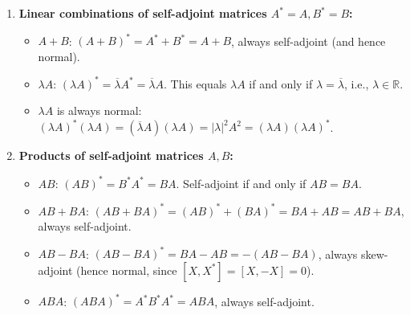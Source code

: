 \begin{exercisesolution*}
\label{sol:algebra_self_adjoint_normal_mc}
\begin{enumerate}[label=\textbf{(\alph*)}]
    \item \textbf{Linear combinations of self-adjoint matrices $A^* = A, B^* = B$:}
    \begin{itemize}
        \item $A + B$: $(A+B)^* = A^* + B^* = A + B$, always self-adjoint (and hence normal).
        \item $\lambda A$: $(\lambda A)^* = \overline{\lambda} A^* = \overline{\lambda} A$. This equals $\lambda A$ if and only if $\lambda = \overline{\lambda}$, i.e., $\lambda \in \mathbb{R}$.
        \item $\lambda A$ is always normal: $(\lambda A)^* (\lambda A) = (\overline{\lambda} A)(\lambda A) = |\lambda|^2 A^2 = (\lambda A)(\lambda A)^*$.
    \end{itemize}

    \item \textbf{Products of self-adjoint matrices $A, B$:}
    \begin{itemize}
        \item $AB$: $(AB)^* = B^* A^* = BA$. Self-adjoint if and only if $AB = BA$.
        \item $AB + BA$: $(AB + BA)^* = (AB)^* + (BA)^* = BA + AB = AB + BA$, always self-adjoint.
        \item $AB - BA$: $(AB - BA)^* = BA - AB = -(AB - BA)$, always skew-adjoint (hence normal, since $[X, X^*] = [X, -X] = 0$).
        \item $ABA$: $(ABA)^* = A^* B^* A^* = ABA$, always self-adjoint.
    \end{itemize}


\end{enumerate}
\end{exercisesolution*}

